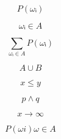 ﻿\[
P(ωᵢ)
\]

\[
ωᵢ∈A
\]

\[
∑_{ωᵢ∈A} P(ωᵢ)
\]

\[
A∪B
\]

\[
x≤y
\]

\[
p∧q
\]

\[
x→∞
\]

\[
P(ωi) ω∈A
\]
